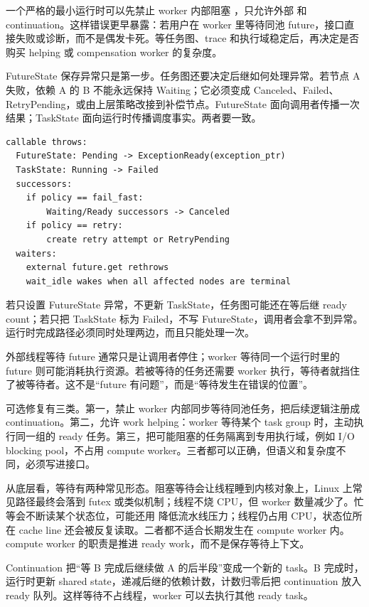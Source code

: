 一个严格的最小运行时可以先禁止 worker 内部阻塞 ，只允许外部  和 continuation。这样错误更早暴露：若用户在 worker 里等待同池 future，接口直接失败或诊断，而不是偶发卡死。等任务图、trace 和执行域稳定后，再决定是否购买 helping 或 compensation worker 的复杂度。

FutureState 保存异常只是第一步。任务图还要决定后继如何处理异常。若节点 A 失败，依赖 A 的 B 不能永远保持 Waiting；它必须变成 Canceled、Failed、RetryPending，或由上层策略改接到补偿节点。FutureState 面向调用者传播一次结果；TaskState 面向运行时传播调度事实。两者要一致。

\begin{lstlisting}[numbers=none,caption={异常从 callable 传播到 future 和后继}]
callable throws:
  FutureState: Pending -> ExceptionReady(exception_ptr)
  TaskState: Running -> Failed
  successors:
    if policy == fail_fast:
        Waiting/Ready successors -> Canceled
    if policy == retry:
        create retry attempt or RetryPending
  waiters:
    external future.get rethrows
    wait_idle wakes when all affected nodes are terminal
\end{lstlisting}

若只设置 FutureState 异常，不更新 TaskState，任务图可能还在等后继 ready count；若只把 TaskState 标为 Failed，不写 FutureState，调用者会拿不到异常。运行时完成路径必须同时处理两边，而且只能处理一次。

外部线程等待 future 通常只是让调用者停住；worker 等待同一个运行时里的 future 则可能消耗执行资源。若被等待的任务还需要 worker 执行，等待者就挡住了被等待者。这不是“future 有问题”，而是“等待发生在错误的位置”。

可选修复有三类。第一，禁止 worker 内部同步等待同池任务，把后续逻辑注册成 continuation。第二，允许 work helping：worker 等待某个 task group 时，主动执行同一组的 ready 任务。第三，把可能阻塞的任务隔离到专用执行域，例如 I/O blocking pool，不占用 compute worker。三者都可以正确，但语义和复杂度不同，必须写进接口。

从底层看，等待有两种常见形态。阻塞等待会让线程睡到内核对象上，Linux 上常见路径最终会落到 futex 或类似机制；线程不烧 CPU，但 worker 数量减少了。忙等会不断读某个状态位，可能还用  降低流水线压力；线程仍占用 CPU，状态位所在 cache line 还会被反复读取。二者都不适合长期发生在 compute worker 内。compute worker 的职责是推进 ready work，而不是保存等待上下文。

Continuation 把“等 B 完成后继续做 A 的后半段”变成一个新的 task。B 完成时，运行时更新 shared state，递减后继的依赖计数，计数归零后把 continuation 放入 ready 队列。这样等待不占线程，worker 可以去执行其他 ready task。

